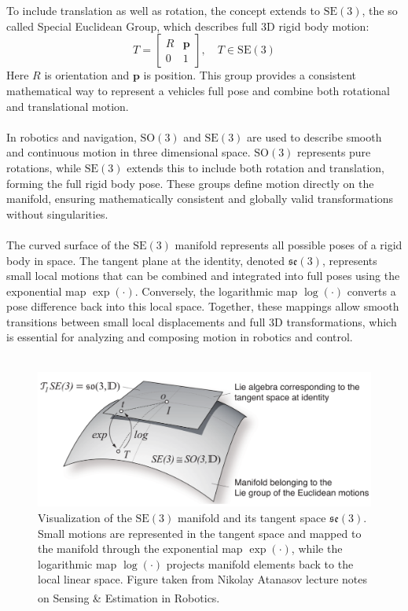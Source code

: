 \\ \\
To include translation as well as rotation, the concept extends to $\mathrm{SE}(3)$, the so called Special Euclidean Group, which describes full 3D rigid body motion:
\begin{equation}
    T =
    \begin{bmatrix}
        R & \mathbf{p} \\
        0 & 1
    \end{bmatrix},
    \quad T \in \mathrm{SE}(3)
    \label{eq:SE3-definition}
\end{equation}
\noindent
Here $R$ is orientation and $\mathbf{p}$ is position. This group provides a consistent mathematical way to represent a vehicles full pose and combine both rotational and translational motion.  
\\ \\
In robotics and navigation, $\mathrm{SO}(3)$ and $\mathrm{SE}(3)$ are used to describe smooth and continuous motion in three dimensional space. $\mathrm{SO}(3)$ represents pure rotations, while $\mathrm{SE}(3)$ extends this to include both rotation and translation, forming the full rigid body pose. These groups define motion directly on the manifold, ensuring mathematically consistent and globally valid transformations without singularities.  
\\ \\
The curved surface of the $\mathrm{SE}(3)$ manifold represents all possible poses of a rigid body in space. The tangent plane at the identity, denoted $\mathfrak{se}(3)$, represents small local motions that can be combined and integrated into full poses using the exponential map $\exp(\cdot)$. Conversely, the logarithmic map $\log(\cdot)$ converts a pose difference back into this local space. Together, these mappings allow smooth transitions between small local displacements and full 3D transformations, which is essential for analyzing and composing motion in robotics and control.  
\\ \\
\begin{figure}[H]
    \centering
    \includegraphics[width=0.8\linewidth]{Pictures/System_Modeling/Orientation_Representations/lie_group_tangent_space.png}
    \caption{Visualization of the $\mathrm{SE}(3)$ manifold and its tangent space $\mathfrak{se}(3)$. Small motions are represented in the tangent space and mapped to the manifold through the exponential map $\exp(\cdot)$, while the logarithmic map $\log(\cdot)$ projects manifold elements back to the local linear space. Figure taken from Nikolay Atanasov lecture notes on Sensing \& Estimation in Robotics.\textsuperscript{\cite{lie_groups_presentation}}}
    \label{fig:system-modeling-so3-se3}
\end{figure}
